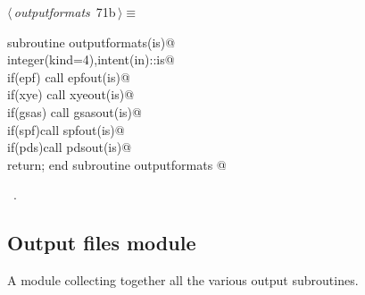 \documentclass[10pt,a4paper,notitlepage]{article}
\begin{document}
\begin{flushleft} \small
\begin{minipage}{\linewidth}\label{scrap80}\raggedright\small
{} $\langle\,${\it outputformats}\nobreak\ {\footnotesize {71b}}$\,\rangle\equiv$
\vspace{-1ex}
\begin{list}{}{} \item
\mbox{}\verb@      subroutine outputformats(is)@\\
\mbox{}\verb@      integer(kind=4),intent(in)::is@\\
\mbox{}\verb@      if(epf) call epfout(is)@\\
\mbox{}\verb@      if(xye) call xyeout(is)@\\
\mbox{}\verb@      if(gsas) call gsasout(is)@\\
\mbox{}\verb@      if(spf)call spfout(is)@\\
\mbox{}\verb@      if(pds)call pdsout(is)@\\
\mbox{}\verb@      return; end subroutine outputformats                                   @{\NWsep}
\end{list}
\vspace{-1.5ex}
\footnotesize
\begin{list}{}{\setlength{\itemsep}{-\parsep}\setlength{\itemindent}{-\leftmargin}}
\item \NWtxtMacroRefIn\ .

\item{}
\end{list}
\end{minipage}\vspace{4ex}
\end{flushleft}
\subsection{Output files module}

A module collecting together all the various output subroutines.
\end{document}

